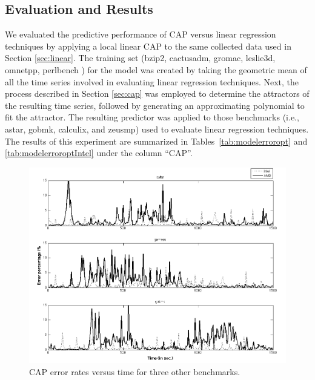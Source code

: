 \documentclass[times,10pt,finalversion]{usetex-v1}
\begin{document}
\subsection{Evaluation and Results}
\label{sec:evaluation}
We evaluated the predictive performance of CAP versus linear regression
techniques by applying a local linear CAP to the same collected data
used in Section \ref{sec:linear}. The training set (bzip2, cactusadm,
gromac, leslie3d, omnetpp, perlbench \cite{Spec2006}) for the model was
created by taking the geometric mean of all the time series involved in
evaluating linear regression techniques. Next, the process described in
Section \ref{sec:cap} was employed to determine the attractors of the
resulting time series, followed by generating an approximating
polynomial to fit the attractor. The resulting predictor was applied to
those benchmarks (i.e., astar, gobmk, calculix, and zeusmp) used to
evaluate linear regression techniques. The results of this experiment
are summarized in Tables~\ref{tab:modelerroropt} and
\ref{tab:modelerroroptIntel} under the column ``CAP''. 
{\setlength{\abovedisplayskip}{0pt plus 0pt minus 0pt}
 \setlength{\belowdisplayskip}{0pt plus 0pt minus 0pt}
\begin{figure}[!h]
  \centering
  \includegraphics[scale=0.32]{pcterr}
  \caption{CAP error rates versus time for three other benchmarks.}
  \label{fig:pcterr}
\end{figure}} 
\end{document}
